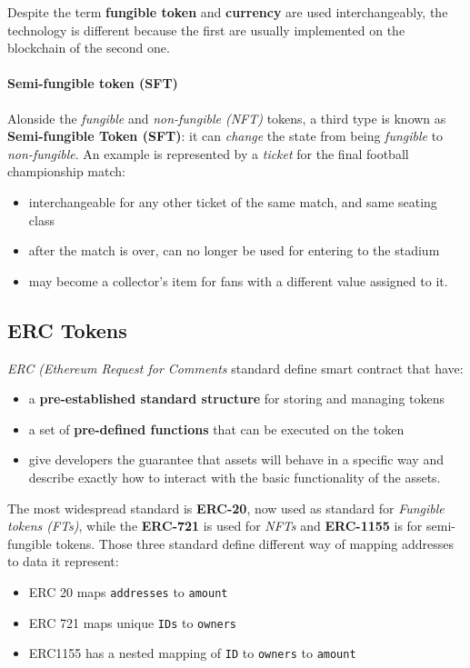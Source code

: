 \documentclass[10pt,a4paper]{report}
\begin{document}
Despite the term \textbf{fungible token} and \textbf{currency} are used interchangeably, the technology is different because the first are usually implemented on the blockchain of the second one.
\paragraph{Semi-fungible token (SFT)}\label{sec:semi-fungible-token-sft}
Alonside the \textit{fungible} and \textit{non-fungible (NFT)} tokens, a third type is  known as \textbf{Semi-fungible Token (SFT)}: it can \textit{change} the state from being \textit{fungible} to \textit{non-fungible}.
An example is represented by a \textit{ticket} for the final football championship match:
\begin{itemize}
	\item 
	interchangeable for any other ticket of the same match, and same seating class
	\item 
	after the match is over, can no longer be used for entering to the stadium
	\item 
	may become a collector’s item for fans with a different value assigned to it.
\end{itemize}
\subsection{ERC Tokens}\label{sec:erc-tokens}
\textit{ERC (Ethereum Request for Comments} standard define smart contract that have:
\begin{itemize}
	\item 
	a \textbf{pre-established standard structure} for storing and managing tokens
	\item 
	a set of \textbf{pre-defined functions} that can be executed on the token
	\item 
	give developers the guarantee that assets will behave in a specific way and describe exactly how to interact with the basic functionality of the assets.
\end{itemize}
	The most widespread standard is \textbf{ERC-20}, now used as standard for \textit{Fungible tokens (FTs)}, while the \textbf{ERC-721} is used for \textit{NFTs} and \textbf{ERC-1155} is for semi-fungible tokens.
Those three standard define different way of mapping addresses to data it represent:
\begin{itemize}
	
	\item 
	ERC 20 maps \texttt{addresses} to \texttt{amount}
	\item 
	ERC 721 maps unique \texttt{IDs} to \texttt{owners}
	\item 
	ERC1155 has a nested mapping of \texttt{ID} to \texttt{owners} to \texttt{amount}
\end{itemize}
\end{document}
